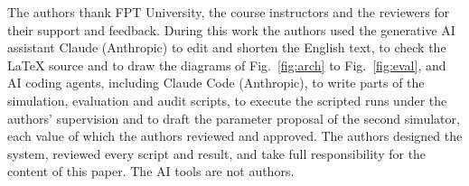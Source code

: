 \documentclass[journal,onecolumn]{IEEEtran}
\begin{document}
The authors thank FPT University, the course instructors and the reviewers for their support and feedback. During this work the authors used the
generative AI assistant Claude (Anthropic) to edit and shorten the English text, to check the \LaTeX{} source and to
draw the diagrams of Fig.~\ref{fig:arch} to Fig.~\ref{fig:eval}, and AI coding agents, including Claude Code
(Anthropic), to write parts of the simulation, evaluation and audit scripts, to execute the scripted runs under the
authors' supervision and to draft the parameter proposal of the second simulator, each value of which the authors
reviewed and approved. The authors designed the system, reviewed every script and result, and take full
responsibility for the content of this paper. The AI tools are not authors.

\begingroup
\def\IEEEbibitemsep{0pt}
\def\footnotesize{\fontsize{6.4pt}{7.3pt}\selectfont}
\setlength{\multicolsep}{2pt plus 1pt minus 1pt}
\end{document}
